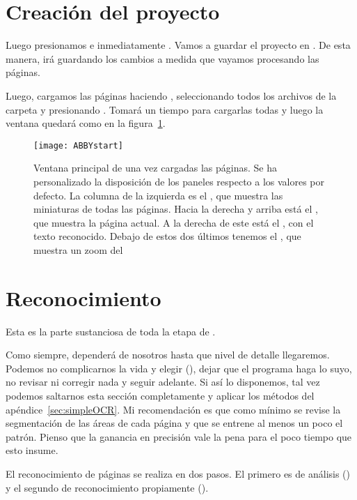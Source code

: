 \documentclass[%
	a5paper,
	10pt,
	twoside,
	openright,
	final,
]{memoir}
\begin{document}
	\section{Creación del proyecto} Luego presionamos  e inmediatamente . Vamos a guardar el proyecto en . De esta manera, \abby irá guardando los cambios a medida que vayamos procesando las páginas.

	Luego, cargamos las páginas haciendo , seleccionando todos los archivos de la carpeta  y presionando . Tomará un tiempo para cargarlas todas y luego la ventana quedará como en la figura~\ref{fig:ABBYstart}.

	\begin{figure}
		\centering
		\texttt{[image: ABBYstart]}
		\caption[Ventana principal de \abby una vez cargadas las páginas]{Ventana principal de \abby una vez cargadas las páginas. Se ha personalizado la disposición de los paneles respecto a los valores por defecto. La columna de la izquierda es el , que muestra las miniaturas de todas las páginas. Hacia la derecha y arriba está el , que muestra la página actual. A la derecha de este está el , con el texto reconocido. Debajo de estos dos últimos tenemos el , que muestra un zoom del \label{fig:ABBYstart}}
	\end{figure}

	\section{Reconocimiento} Esta es la parte sustanciosa de toda la etapa de \ocr.

	Como siempre, dependerá de nosotros hasta que nivel de detalle llegaremos. Podemos no complicarnos la vida y elegir  (), dejar que el programa haga lo suyo, no revisar ni corregir nada y seguir adelante. Si así lo disponemos, tal vez podemos saltarnos esta sección completamente y aplicar los métodos del apéndice~\ref{sec:simpleOCR}. Mi recomendación es que como mínimo se revise la segmentación de las áreas de cada página y que se entrene al menos un poco el patrón. Pienso que la ganancia en precisión vale la pena para el poco tiempo que esto insume.

	El reconocimiento de páginas se realiza en dos pasos. El primero es de análisis () y el segundo de reconocimiento propiamente ().
\end{document}
